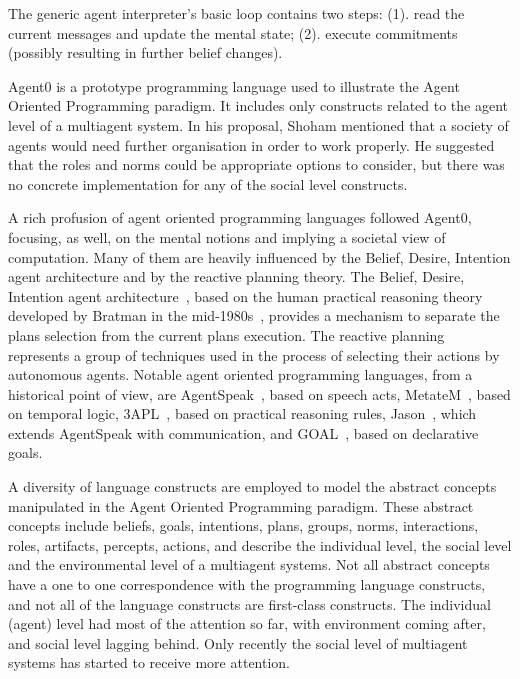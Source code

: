 \documentclass[a4paper,12pt,oneside,fleqn]{book} %
\begin{document}
The generic agent interpreter's basic loop contains two steps: (1). read
the current messages and update the mental state; (2). execute commitments
(possibly resulting in further belief changes).

Agent0 is a prototype programming language used to illustrate the Agent
Oriented Programming paradigm. It includes only constructs related to the
agent level of a multiagent system. In his proposal, Shoham mentioned that
a society of agents would need further organisation in order to work
properly. He suggested that the roles and norms could be appropriate
options to consider, but there was no concrete implementation for any of
the social level constructs.

A rich profusion of agent oriented programming languages followed Agent0,
focusing, as well, on the mental notions and implying a societal view of
computation.  Many of them are heavily influenced by the Belief, Desire,
Intention agent architecture and by the reactive planning theory.  The
Belief, Desire, Intention agent architecture~\cite{DBLP:conf/icmas/RaoG95},
based on the human practical reasoning theory developed by Bratman in the
mid-1980s~\cite{Bratman:1999}, provides a mechanism to separate the plans
selection from the current plans execution.  The reactive
planning~\cite{DBLP:conf/aaai/GeorgeffL87} represents a group of techniques
used in the process of selecting their actions by autonomous agents.
Notable agent oriented programming languages, from a historical point of
view, are AgentSpeak~\cite{DBLP:conf/maamaw/Rao96}, based on speech acts,
MetateM~\cite{DBLP:conf/promas/Fisher05}, based on temporal logic,
3APL~\cite{DBLP:conf/promas/DastaniRDM03}, based on practical reasoning
rules, Jason~\cite{DBLP:books/sp/map2005/BordiniHV05}, which extends
AgentSpeak with communication, and
GOAL~\cite{DBLP:journals/corr/cs-AI-0207008}, based on declarative goals.

A diversity of language constructs are employed to model the abstract
concepts manipulated in the Agent Oriented Programming paradigm. These
abstract concepts include beliefs, goals, intentions, plans, groups, norms,
interactions, roles, artifacts, percepts, actions, and describe the
individual level, the social level and the environmental level of a
multiagent systems. Not all abstract concepts have a one to one
correspondence with the programming language constructs, and not all of the
language constructs are first-class constructs. The individual (agent) level
had most of the attention so far, with environment coming after, and social
level lagging behind. Only recently the social level of multiagent systems
has started to receive more attention.
\end{document}
